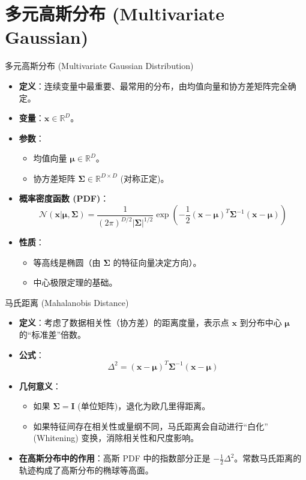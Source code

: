 \documentclass[12pt, aspectratio=169]{beamer}
\newcommand{\vect}[1]{\mathbf{#1}}
\newcommand{\mat}[1]{\mathbf{#1}}
\newcommand{\R}{\mathbb{R}}
\newcommand{\N}{\mathcal{N}}
\begin{document}
\section{多元高斯分布 (Multivariate Gaussian)}

\begin{frame}{多元高斯分布 (Multivariate Gaussian Distribution)}
    \begin{itemize}
        \item \textbf{定义}：连续变量中最重要、最常用的分布，由均值向量和协方差矩阵完全确定。
        \item \textbf{变量}：$\vect{x} \in \R^D$。
        \item \textbf{参数}：
        \begin{itemize}
            \item 均值向量 $\boldsymbol{\mu} \in \R^D$。
            \item 协方差矩阵 $\boldsymbol{\Sigma} \in \R^{D \times D}$ (对称正定)。
        \end{itemize}
        \item \textbf{概率密度函数 (PDF)}：
        $$ \N(\vect{x}|\boldsymbol{\mu}, \boldsymbol{\Sigma}) = \frac{1}{(2\pi)^{D/2} |\boldsymbol{\Sigma}|^{1/2}} \exp\left( -\frac{1}{2} (\vect{x}-\boldsymbol{\mu})^T \boldsymbol{\Sigma}^{-1} (\vect{x}-\boldsymbol{\mu}) \right) $$
        \item \textbf{性质}：
        \begin{itemize}
            \item 等高线是椭圆（由 $\boldsymbol{\Sigma}$ 的特征向量决定方向）。
            \item 中心极限定理的基础。
        \end{itemize}
    \end{itemize}
\end{frame}

\begin{frame}{马氏距离 (Mahalanobis Distance)}
    \begin{itemize}
        \item \textbf{定义}：考虑了数据相关性（协方差）的距离度量，表示点 $\vect{x}$ 到分布中心 $\boldsymbol{\mu}$ 的“标准差”倍数。
        \item \textbf{公式}：
        $$ \Delta^2 = (\vect{x} - \boldsymbol{\mu})^T \boldsymbol{\Sigma}^{-1} (\vect{x} - \boldsymbol{\mu}) $$
        \item \textbf{几何意义}：
        \begin{itemize}
            \item 如果 $\boldsymbol{\Sigma} = \mat{I}$ (单位矩阵)，退化为欧几里得距离。
            \item 如果特征间存在相关性或量纲不同，马氏距离会自动进行“白化” (Whitening) 变换，消除相关性和尺度影响。
        \end{itemize}
        \item \textbf{在高斯分布中的作用}：高斯 PDF 中的指数部分正是 $-\frac{1}{2}\Delta^2$。常数马氏距离的轨迹构成了高斯分布的椭球等高面。
    \end{itemize}
\end{frame}
\end{document}
